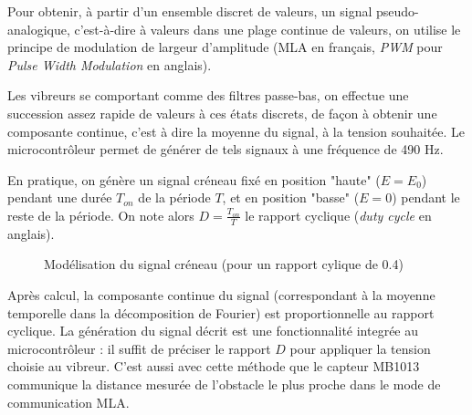 \documentclass[a4paper, 11pt]{article}
\begin{document}
\par Pour obtenir, à partir d'un ensemble discret de valeurs, un signal pseudo-analogique, c'est-à-dire à valeurs dans une plage continue de valeurs, on utilise le principe de modulation de largeur d'amplitude (MLA en français, \textit{PWM} pour \textit{Pulse Width Modulation} en anglais).

\par Les vibreurs se comportant comme des filtres passe-bas, on effectue une succession assez rapide de valeurs à ces états discrets, de façon à obtenir une composante continue, c'est à dire la moyenne du signal, à la tension souhaitée. Le microcontrôleur permet de générer de tels signaux à une fréquence de 490 Hz.

\par En pratique, on génère un signal créneau fixé en position "haute" ($E = E_0$) pendant une durée $T_{on}$ de la période $T$, et en position "basse" ($E = 0$) pendant le reste de la période. On note alors $D = \frac{T_{on}}{T}$ le rapport cyclique ({\it duty cycle} en anglais).

\begin{figure}[H]
\centering
{}
\caption{Modélisation du signal créneau (pour un rapport cylique de 0.4)}
\end{figure}

\par Après calcul, la composante continue du signal (correspondant à la moyenne temporelle dans la décomposition de Fourier) est proportionnelle au rapport cyclique. La génération du signal décrit est une fonctionnalité integrée au microcontrôleur : il suffit de préciser le rapport $D$ pour appliquer la tension choisie au vibreur. C'est aussi avec cette méthode que le capteur MB1013 communique la distance mesurée de l'obstacle le plus proche dans le mode de communication MLA.
\end{document}
